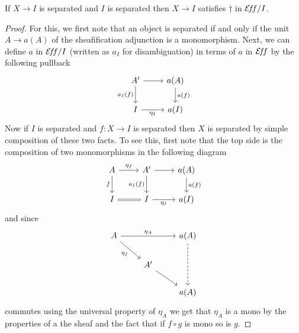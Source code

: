 \begin{lem}\label{lem:orth:sepsliceimpliesdagger}
  If $X \to I$ is separated and $I$ is separated then $X \to I$
  satisfies $\dagger$ in $\mathcal{E}\!f\!f/I$.
\end{lem}
\begin{proof}
  For this, we first note that an object is separated if and only if
  the unit $A \to a(A)$ of the sheafification adjunction is a
  monomorphism. Next, we can define $a$ in $\mathcal{E}\!f\!f/I$ (written as $a_I$
  for disambiguation) in terms of $a$ in $\mathcal{E}\!f\!f$ by the following
  pullback
  \[
    \begin{tikzcd}
      A' \ar[r] \ar[d, swap, "a_I(f)"] & a(A) \ar[d, "a(f)"]\\
      I \ar[r, swap, "\eta_I"] & a(I)
    \end{tikzcd}
  \]
  Now if $I$ is separated and $f : X \to I$ is separated then $X$ is
  separated by simple composition of these two facts. To see this,
  first note that the top side is the composition of two monomorphisms
  in the following diagram
  \[
    \begin{tikzcd}
      A \ar[d, swap, "f"] \ar[r, "\eta_f"] & A' \ar[r] \ar[d, swap, "a_I(f)"] & a(A) \ar[d, "a(f)"]\\
      I \ar[r, equals] & I \ar[r, swap, "\eta_I"] & a(I)
    \end{tikzcd}
  \]
  and since
  \[
    \begin{tikzcd}
      A \ar[rd, swap, "\eta_f"] \ar[rr, "\eta_A"]&& a(A) \ar[dd, dashed]\\
      &A' \ar[dr]&\\
      && a(A)
    \end{tikzcd}
  \]
  commutes using the universal property of $\eta_A$ we get that
  $\eta_A$ is a mono by the properties of a the sheaf and the fact
  that if $f \circ g$ is mono so is $g$.


\end{proof}
